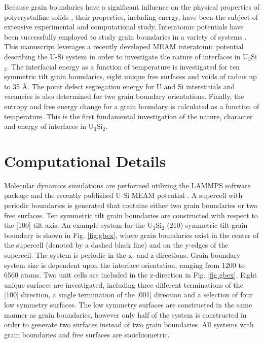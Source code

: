 \documentclass[review]{elsarticle}
\begin{document}
Because grain boundaries have a significant influence on the physical properties of polycrystalline solids \cite{brandon2010, harmer2010}, their properties, including energy, have been the subject of extensive experimental and computational study. Interatomic potentials have been successfully employed to study grain boundaries in a variety of systems \cite{morita1997, wolf1989bcc1, wolf1990bcc2, ratanaphan2015, novoselov2014, tschopp2012probing, hahn2016}. This manuscript leverages a recently developed MEAM interatomic potential describing the U-Si system in order to investigate the nature of interfaces in U$_{3}$Si$_{2}$. The interfacial energy as a function of temperature is investigated for ten symmetric tilt grain boundaries, eight unique free surfaces and voids of radius up to 35 {\AA}. The point defect segregation energy for U and Si interstitials and vacancies is also determined for two grain boundary orientations. Finally, the entropy and free energy change for a grain boundary is calculated as a function of temperature. This is the first fundamental investigation of the nature, character and energy of interfaces in U$_{3}$Si$_{2}$. 

\section{Computational Details}
Molecular dynamics simulations are performed utilizing the LAMMPS \cite{plimpton1995} software package and the recently published U-Si MEAM potential \cite{beelerUSi}. A supercell with periodic boundaries is generated that contains either two grain boundaries or two free surfaces. Ten symmetric tilt grain boundaries are constructed with respect to the [100] tilt axis. An example system for the U$_{3}$Si$_{2}$ (210) symmetric tilt grain boundary is shown in Fig. \ref{fig:gbex}, where grain boundaries exist in the center of the supercell (denoted by a dashed black line) and on the y-edges of the supercell. The system is periodic in the x- and z-directions. Grain boundary system size is dependent upon the interface orientation, ranging from 1200 to 6560 atoms. Two unit cells are included in the z-direction in Fig. \ref{fig:gbex}. Eight unique surfaces are investigated, including three different terminations of the [100] direction, a single termination of the [001] direction and a selection of four low symmetry surfaces. The low symmetry surfaces are constructed in the same manner as grain boundaries, however only half of the system is constructed in order to generate two surfaces instead of two grain boundaries. All systems with grain boundaries and free surfaces are stoichiometric. 
\end{document}
